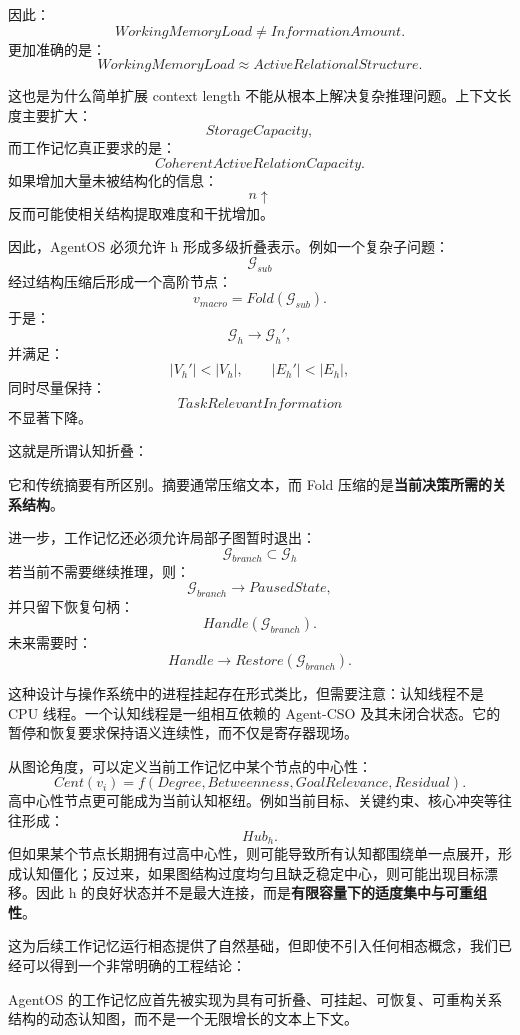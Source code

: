 因此：
\[
\boxed{
WorkingMemoryLoad
\neq
InformationAmount.
}
\]
更加准确的是：
\[
\boxed{
WorkingMemoryLoad
\approx
ActiveRelationalStructure.
}
\]

这也是为什么简单扩展 context length 不能从根本上解决复杂推理问题。上下文长度主要扩大：
\[
StorageCapacity,
\]
而工作记忆真正要求的是：
\[
CoherentActiveRelationCapacity.
\]
如果增加大量未被结构化的信息：
\[
n\uparrow
\]
反而可能使相关结构提取难度和干扰增加。

因此，AgentOS 必须允许 h 形成多级折叠表示。例如一个复杂子问题：
\[
\mathcal G_{sub}
\]
经过结构压缩后形成一个高阶节点：
\[
v_{macro}
=
Fold(\mathcal G_{sub}).
\]
于是：
\[
\mathcal G_h
\rightarrow
\mathcal G_h',
\]
并满足：
\[
|V_h'|<|V_h|,
\qquad
|E_h'|<|E_h|,
\]
同时尽量保持：
\[
TaskRelevantInformation
\]
不显著下降。

这就是所谓认知折叠：
\begin{statementbox}
\centering
{}
\end{statementbox}

它和传统摘要有所区别。摘要通常压缩文本，而 Fold 压缩的是\textbf{当前决策所需的关系结构}。

进一步，工作记忆还必须允许局部子图暂时退出：
\[
\mathcal G_{branch}
\subset
\mathcal G_h
\]
若当前不需要继续推理，则：
\[
\mathcal G_{branch}
\rightarrow
PausedState,
\]
并只留下恢复句柄：
\[
Handle(\mathcal G_{branch}).
\]
未来需要时：
\[
Handle
\rightarrow
Restore(\mathcal G_{branch}).
\]

这种设计与操作系统中的进程挂起存在形式类比，但需要注意：认知线程不是 CPU 线程。一个认知线程是一组相互依赖的 Agent-CSO 及其未闭合状态。它的暂停和恢复要求保持语义连续性，而不仅是寄存器现场。

从图论角度，可以定义当前工作记忆中某个节点的中心性：
\[
Cent(v_i)
=
f(
Degree,
Betweenness,
GoalRelevance,
Residual
).
\]
高中心性节点更可能成为当前认知枢纽。例如当前目标、关键约束、核心冲突等往往形成：
\[
Hub_h.
\]
但如果某个节点长期拥有过高中心性，则可能导致所有认知都围绕单一点展开，形成认知僵化；反过来，如果图结构过度均匀且缺乏稳定中心，则可能出现目标漂移。因此 h 的良好状态并不是最大连接，而是\textbf{有限容量下的适度集中与可重组性}。

这为后续工作记忆运行相态提供了自然基础，但即使不引入任何相态概念，我们已经可以得到一个非常明确的工程结论：
\begin{conclusion}
AgentOS 的工作记忆应首先被实现为具有可折叠、可挂起、可恢复、可重构关系结构的动态认知图，而不是一个无限增长的文本上下文。
\end{conclusion}

